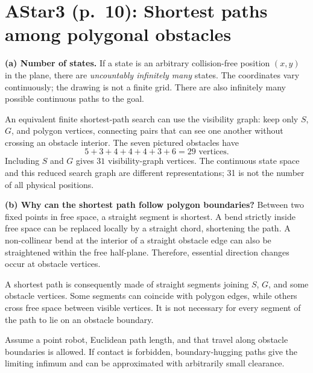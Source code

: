 \documentclass[11pt,a4paper]{article}
\newcommand{\question}[2]{\section*{#1: #2}}
\begin{document}
\newpage
\question{AStar3 (p.\ 10)}{Shortest paths among polygonal obstacles}
\textbf{(a) Number of states.} If a state is an arbitrary collision-free position $(x,y)$ in the plane, there are \emph{uncountably infinitely many} states. The coordinates vary continuously; the drawing is not a finite grid. There are also infinitely many possible continuous paths to the goal.

An equivalent finite shortest-path search can use the visibility graph: keep only $S$, $G$, and polygon vertices, connecting pairs that can see one another without crossing an obstacle interior. The seven pictured obstacles have
\[
5+3+4+4+4+3+6=29\text{ vertices}.
\]
Including $S$ and $G$ gives $\boxed{31}$ visibility-graph vertices. The continuous state space and this reduced search graph are different representations; 31 is not the number of all physical positions.

\textbf{(b) Why can the shortest path follow polygon boundaries?} Between two fixed points in free space, a straight segment is shortest. A bend strictly inside free space can be replaced locally by a straight chord, shortening the path. A non-collinear bend at the interior of a straight obstacle edge can also be straightened within the free half-plane. Therefore, essential direction changes occur at obstacle vertices.

A shortest path is consequently made of straight segments joining $S$, $G$, and some obstacle vertices. Some segments can coincide with polygon edges, while others cross free space between visible vertices. It is not necessary for every segment of the path to lie on an obstacle boundary.

\begin{center}\end{center}
Assume a point robot, Euclidean path length, and that travel along obstacle boundaries is allowed. If contact is forbidden, boundary-hugging paths give the limiting infimum and can be approximated with arbitrarily small clearance.
\end{document}
